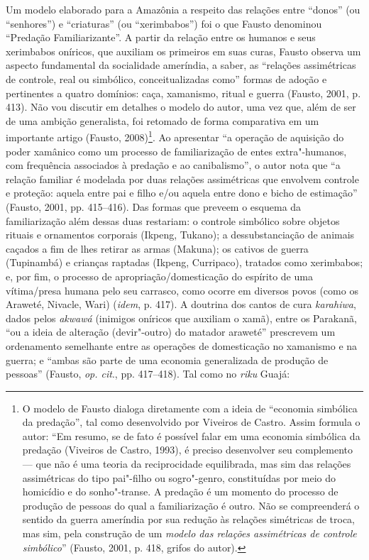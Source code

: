 Um modelo elaborado para a Amazônia a respeito das relações entre
``donos'' (ou ``senhores'') e ``criaturas'' (ou ``xerimbabos'') foi o que Fausto
denominou ``Predação Familiarizante''. A partir da relação entre os
humanos e seus xerimbabos oníricos, que auxiliam os primeiros em suas
curas, Fausto observa um aspecto fundamental da socialidade ameríndia, a
saber, as ``relações assimétricas de controle, real ou simbólico,
conceitualizadas como'' formas de adoção e pertinentes a quatro domínios:
caça, xamanismo, ritual e guerra (Fausto, 2001, p. 413). Não vou
discutir em detalhes o modelo do autor, uma vez que, além de ser de uma
ambição generalista, foi retomado de forma comparativa em um importante
artigo (Fausto, 2008)\footnote{O modelo de Fausto dialoga diretamente
  com a ideia de ``economia simbólica da predação'', tal como desenvolvido
  por Viveiros de Castro. Assim formula o autor: ``Em resumo, se de fato
      é possível falar em uma economia simbólica da predação (Viveiros de
      Castro, 1993), é preciso desenvolver seu complemento --- que não é uma
      teoria da reciprocidade equilibrada, mas sim das relações assimétricas
      do tipo pai"-filho ou sogro"-genro, constituídas por meio do homicídio e
      do sonho"-transe. A predação é um momento do processo de produção de
      pessoas do qual a familiarização é outro. Não se compreenderá o
      sentido da guerra ameríndia por sua redução às relações simétricas de
      troca, mas sim, pela construção de um \emph{modelo das relações
      assimétricas de controle simbólico}'' (Fausto, 2001, p. 418, grifos do
  autor).}. Ao apresentar ``a operação de aquisição do poder xamânico
    como um processo de familiarização de entes extra"-humanos, com
    frequência associados à predação e ao canibalismo'', o autor nota que ``a
        relação familiar é modelada por duas relações assimétricas que envolvem
        controle e proteção: aquela entre pai e filho e/ou aquela entre dono e
        bicho de estimação'' (Fausto, 2001, pp. 415--416). Das formas que preveem o
esquema da familiarização além dessas duas restariam: o controle
simbólico sobre objetos rituais e ornamentos corporais (Ikpeng, Tukano);
a dessubstanciação de animais caçados a fim de lhes retirar as armas
(Makuna); os cativos de guerra (Tupinambá) e crianças raptadas (Ikpeng,
Curripaco), tratados como xerimbabos; e, por fim, o processo de
apropriação/domesticação do espírito de uma vítima/presa humana pelo seu
carrasco, como ocorre em diversos povos (como os Araweté, Nivacle, Wari)
(\emph{idem}, p. 417). A doutrina dos cantos de cura \emph{karahiwa}, dados
pelos \emph{akwawá} (inimigos oníricos que auxiliam o xamã), entre os
Parakanã, ``ou a ideia de alteração (devir"-outro) do matador araweté''
prescrevem um ordenamento semelhante entre as operações de domesticação
no xamanismo e na guerra; e ``ambas são parte de uma economia
generalizada de produção de pessoas'' (Fausto, \emph{op. cit}., pp. 417--418). Tal
como no \emph{riku} Guajá:

